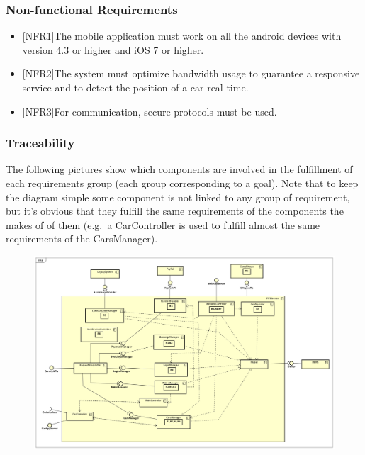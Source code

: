 \documentclass[]{article}
\providecommand{\tightlist}{%
  \setlength{\itemsep}{0pt}\setlength{\parskip}{0pt}}
\begin{document}
\subsubsection{Non-functional
Requirements}\label{non-functional-requirements}

\begin{itemize}
\tightlist
\item
  {[}NFR1{]}The mobile application must work on all the android devices
  with version 4.3 or higher and iOS 7 or higher.
\item
  {[}NFR2{]}The system must optimize bandwidth usage to guarantee a
  responsive service and to detect the position of a car real time.
\item
  {[}NFR3{]}For communication, secure protocols must be used.
\end{itemize}

\subsubsection{Traceability}\label{traceability}

The following pictures show which components are involved in the
fulfillment of each requirements group (each group corresponding to a
goal). Note that to keep the diagram simple some component is not linked
to any group of requirement, but it's obvious that they fulfill the same
requirements of the components the makes of of them (e.g.~a
CarController is used to fulfill almost the same requirements of the
CarsManager).

\begin{figure}
\centering
\includegraphics[width=1.00000\textwidth,height=1.00000\textwidth]{./comp_diagrams/system_reqt.png}
\caption{}\label{id}
\end{figure}
\end{document}
